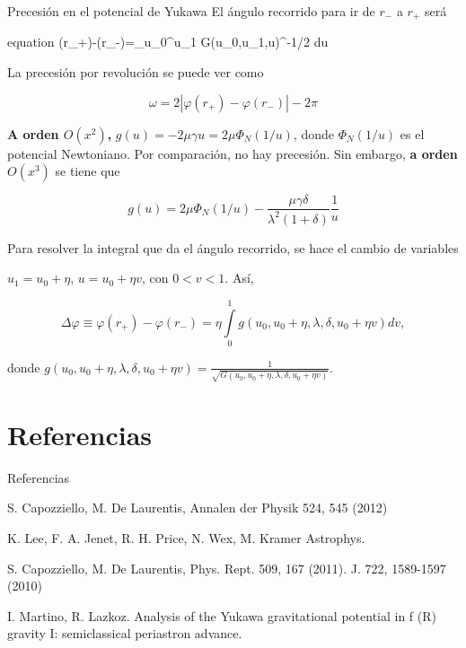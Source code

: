 \documentclass{beamer}
\begin{document}
\begin{frame}[allowframebreaks]{Precesión en el potencial de Yukawa}
	El ángulo recorrido para ir de  $r_-$ a $r_+$ será
	
	\begin{empheq}[box=\tcbhighmath]{equation}
	\varphi(r_+)-\varphi(r_-)=\int\limits_{u_0}^{u_1} G(u_0,u_1,u)^{-1/2} du
	\end{empheq}
	
	La precesión por revolución se puede ver como
	
	\begin{equation}
		\boxed{\omega=2|\varphi(r_+)-\varphi(r_-)| -2\pi}
	\end{equation}
	
	\textbf{A orden $O(x^2)$,} $g(u)=-2\mu\gamma u=2\mu\Phi_N(1/u)$, donde $\Phi_N(1/u)$ es el potencial Newtoniano. Por comparación, no hay precesión. Sin embargo, \textbf{a orden $O(x^3)$} se tiene que 
	
	$$g(u)=2\mu\Phi_N(1/u)-\frac{\mu\gamma\delta}{\lambda^2(1+\delta)}\frac{1}{u}$$
	
	Para resolver la integral que da el ángulo recorrido, se hace el cambio de variables
	
	\begin{center}
		$u_1=u_0+\eta$, $u=u_0+\eta v$, con $0<v<1.$ Así,
	\end{center}

	\begin{equation}
		\Delta \varphi \equiv \varphi(r_+)-\varphi(r_-) = \eta \int\limits_0^1 g(u_0,u_0+\eta,\lambda,\delta,u_0+\eta v) dv,
	\end{equation}
	
	donde $g(u_0,u_0+\eta,\lambda,\delta,u_0+\eta v)=\frac{1}{\sqrt{G(u_0,u_0+\eta,\lambda,\delta,u_0+\eta v)}}.$ 
	\end{frame}
	\section{Referencias}
	\begin{frame}[allowframebreaks]{Referencias}
	\begin{thebibliography}{9}
		 S. Capozziello, M. De Laurentis, Annalen der Physik 524, 545 (2012) 
		
		 K. Lee, F. A. Jenet, R. H. Price, N. Wex, M. Kramer Astrophys.
		
		 S. Capozziello, M. De Laurentis, Phys. Rept. 509, 167 (2011).
J. 722, 1589-1597 (2010)

		 I. Martino, R. Lazkoz. Analysis of the Yukawa gravitational potential in f (R) gravity I: semiclassical periastron advance.
	\end{thebibliography}
	\end{frame}
\end{document}
